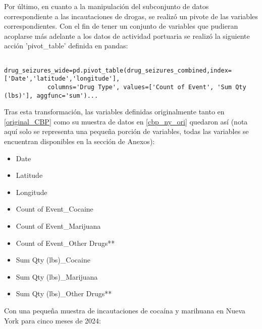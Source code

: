 \documentclass[12pt]{article}
\begin{document}
		Por último, en cuanto a la manipulación del subconjunto de datos correspondiente a las incautaciones de drogas, se realizó un pivote de las variables correspondientes. Con el fin de tener un conjunto de variables que pudieran acoplarse más adelante a los datos de actividad portuaria se realizó la siguiente acción 'pivot\_table' definida en pandas:
		
		\begin{verbatim}
			drug_seizures_wide=pd.pivot_table(drug_seizures_combined,index=['Date','latitude','longitude'],
			columns='Drug Type', values=['Count of Event', 'Sum Qty (lbs)'], aggfunc='sum')...
		\end{verbatim}
	
		Tras esta transformación, las variables definidas originalmente tanto en \ref{original_CBP} como su muestra de datos en \ref{cbp_ny_ori} quedaron así (nota aquí solo se representa una pequeña porción de variables, todas las variables se encuentran disponibles en la sección de Anexos):
		
		\begin{itemize}
			\item Date
			\item Latitude
			\item Longitude
			\item Count of Event\_Cocaine
			\item Count of Event\_Marijuana
			\item Count of Event\_Other Drugs**
			\item Sum Qty (lbs)\_Cocaine
			\item Sum Qty (lbs)\_Marijuana
			\item Sum Qty (lbs)\_Other Drugs**
		\end{itemize}
		
		Con una pequeña muestra de incautaciones de cocaína y marihuana en Nueva York para cinco meses de 2024:
		
\end{document}
